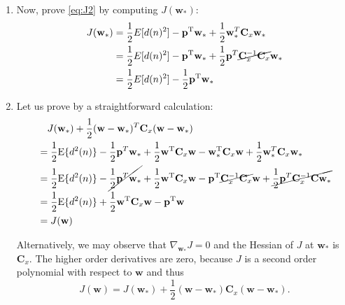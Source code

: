 \begin{enumerate}
\begin{solution}
\begin{enumerate}
    \item
      Now, prove \eqref{eq:J2} by computing $J(\mathbf{w}_*)$:
      \begin{align*}
        J(\mathbf{w}_*) &= \frac{1}{2} E[d(n)^2] -
        \mathbf{p}^{\mathrm{T}} \mathbf{w}_* + \frac{1}{2}
        \mathbf{w}_*^T \mathbf{C}_x \mathbf{w}_*
        \\
        &= \frac{1}{2} E[d(n)^2] - \mathbf{p}^{\mathrm{T}}
        \mathbf{w}_* + \frac{1}{2} \mathbf{p}^T
        \cancel{\mathbf{C}^{-1}_x \mathbf{C}_x} \mathbf{w}_*
        \\
        &= \frac{1}{2} E[d(n)^2] - \frac{1}{2}\mathbf{p}^{\mathrm{T}}
        \mathbf{w}_*
      \end{align*}
    \item
      Let us prove by a straightforward calculation:
      \begin{align*}
        &\quad J(\mathbf{w}_*) + \frac{1}{2}( \mathbf{w} -
        \mathbf{w}_*)^T \mathbf{C}_x (\mathbf{w} - \mathbf{w}_*)
        \\
        &= \frac{1}{2} \mathrm{E}\{ d^2(n) \} - \frac{1}{2}
        \mathbf{p}^T \mathbf{w}_* + \frac{1}{2}\mathbf{w}^{\mathrm{T}}
        \mathbf{C}_x \mathbf{w} -
        \mathbf{w}_*^{\mathrm{T}}\mathbf{C}_x \mathbf{w} + \frac{1}{2}
        \mathbf{w}^T_* \mathbf{C}_x\mathbf{w}_*
        \\
        &= \frac{1}{2} \mathrm{E}\{ d^2(n) \} - \cancel{\frac{1}{2}
          \mathbf{p}^T \mathbf{w}_*} +
        \frac{1}{2}\mathbf{w}^{\mathrm{T}} \mathbf{C}_x \mathbf{w} -
        \mathbf{p}^{\mathrm{T}}\cancel{\mathbf{C}_x^{-1}\mathbf{C}_x}\mathbf{w}
        + \cancel{\frac{1}{2} \mathbf{p}^T\mathbf{C}_x^{-1}
          \mathbf{Cw}_*}
        \\
        &= \frac{1}{2} \mathrm{E}\{ d^2(n) \} +
        \frac{1}{2}\mathbf{w}^{\mathrm{T}} \mathbf{C}_x \mathbf{w} -
        \mathbf{p}^{\mathrm{T}}\mathbf{w}
        \\
        &= J(\mathbf{w})
      \end{align*}

      Alternatively, we may observe that $\nabla_{\mathbf{w}_*} J = 0$
      and the Hessian of $J$ at $\mathbf{w}_*$ is $\mathbf{C}_x$.  The
      higher order derivatives are zero, because $J$ is a second order
      polynomial with respect to $\mathbf{w}$ and thus
      \begin{equation*}
        J(\mathbf{w}) = J( \mathbf{w}_* ) + \frac{1}{2} ( \mathbf{w} -
        \mathbf{w}_* ) \mathbf{C}_x ( \mathbf{w} - \mathbf{w}_* ) . 
      \end{equation*}
    \end{enumerate}

  \end{solution}
  
\end{enumerate}



